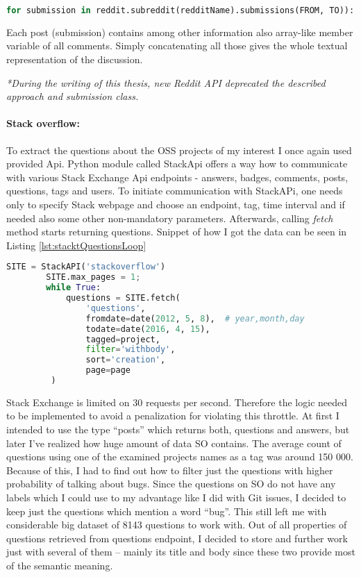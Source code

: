 \begin{lstlisting}[caption={Getting posts from subreddit},label={lst:redditSubmissionsLoop},language=Python]
for submission in reddit.subreddit(redditName).submissions(FROM, TO)):
\end{lstlisting}

Each post (submission) contains among other information also array-like member variable of all comments. Simply concatenating all those gives the whole textual representation of the discussion.

\textit{*During the writing of this thesis, new Reddit API deprecated the described approach and submission class.}


\paragraph{Stack overflow:}
To extract the questions about the OSS projects of my interest I once again used provided Api. Python module called StackApi offers a way how to communicate with various Stack Exchange Api endpoints - answers, badges, comments, posts, questions, tags and users. To initiate communication with StackAPi, one needs only to specify Stack webpage and choose an endpoint, tag, time interval and if needed also some other non-mandatory parameters. Afterwards, calling \textit{fetch} method starts returning questions. Snippet of how I got the data can be seen in Listing \ref{lst:stacktQuestionsLoop}

\begin{lstlisting}[caption={Getting Stackoverflow questions with StackApi},label={lst:stacktQuestionsLoop},language=Python]
	SITE = StackAPI('stackoverflow')
    	SITE.max_pages = 1;
    	while True:
    		questions = SITE.fetch(
    			'questions',
    			fromdate=date(2012, 5, 8),  # year,month,day
        		todate=date(2016, 4, 15),
        		tagged=project,
        		filter='withbody',
        		sort='creation',
        		page=page
         )
\end{lstlisting}

Stack Exchange is limited on 30 requests per second. Therefore the logic needed to be implemented to avoid a penalization for violating this throttle. At first I intended to use the type “posts” which returns both, questions and answers, but later I've realized how huge amount of data SO contains.  The average count of questions using one of the examined projects names as a tag was around 150 000. Because of this, I had to find out how to filter just the questions with higher probability of talking about bugs. Since the questions on SO do not have any labels which I could use to my advantage like I did with Git issues, I decided to keep just the questions which mention a word “bug”. This still left me with considerable big dataset of 8143 questions to work with. Out of all properties of questions retrieved from questions endpoint, I decided to store and further work just with several of them – mainly its title and body since these two provide most of the semantic meaning.